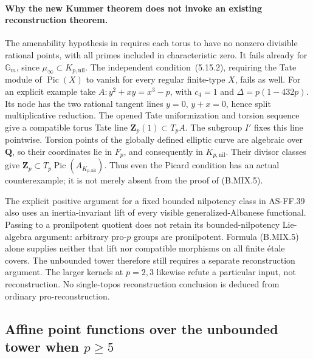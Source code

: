 \documentclass[11pt,a4paper]{article}
\newcommand{\Z}{\mathbf Z}
\newcommand{\Q}{\mathbf Q}
\begin{document}
\paragraph{Why the new Kummer theorem does not invoke an existing reconstruction theorem.}
The amenability hypothesis in
\citep[Definition~5.15(5.15.1)]{CarlsonHaineWolf2024}
requires each torus to have no nonzero divisible rational
points, with all primes included in characteristic zero.
It fails already for \(\mathbb G_m\), since
\(\mu_\infty\subset K_{p,\mathrm{nil}}\).
The independent condition~(5.15.2), requiring the Tate module
of \(\operatorname{Pic}(X)\) to vanish for every regular
finite-type \(X\), fails as well. For an explicit example take
\(A:y^2+xy=x^3-p\), with \(c_4=1\) and
\(\Delta=p(1-432p)\). Its node has the two rational tangent
lines \(y=0\), \(y+x=0\), hence split multiplicative reduction.
The opened Tate uniformization and torsion sequence
\citep[Theorem~1, author p.~6; pp.~18--19]{Tate1995}
give a compatible torus Tate line \(\Z_p(1)\subset T_pA\).
The subgroup \(I'\) fixes this line pointwise. Torsion points
of the globally defined elliptic curve are algebraic over
\(\Q\), so their coordinates lie in \(F_p\), and consequently
in \(K_{p,\mathrm{nil}}\). Their divisor classes give
\(\Z_p\subset T_p\operatorname{Pic}(A_{K_{p,\mathrm{nil}}})\).
Thus even the Picard condition has an actual counterexample;
it is not merely absent from the proof of (B.MIX.5).

The explicit positive argument for a fixed bounded nilpotency
class in AS-FF.39 also uses an inertia-invariant lift of every
visible generalized-Albanese functional. Passing to a
pronilpotent quotient does not retain its bounded-nilpotency
Lie-algebra argument: arbitrary pro-\(p\) groups are
pronilpotent. Formula (B.MIX.5) alone supplies neither that
lift nor compatible morphisms on all finite étale covers.
The unbounded tower therefore still requires a separate
reconstruction argument. The larger kernels at \(p=2,3\)
likewise refute a particular input, not reconstruction.
No single-topos reconstruction conclusion is deduced from
ordinary pro-reconstruction.

\subsection{Affine point functions over the unbounded tower when \texorpdfstring{\(p\geq5\)}{p >= 5}}
\end{document}
